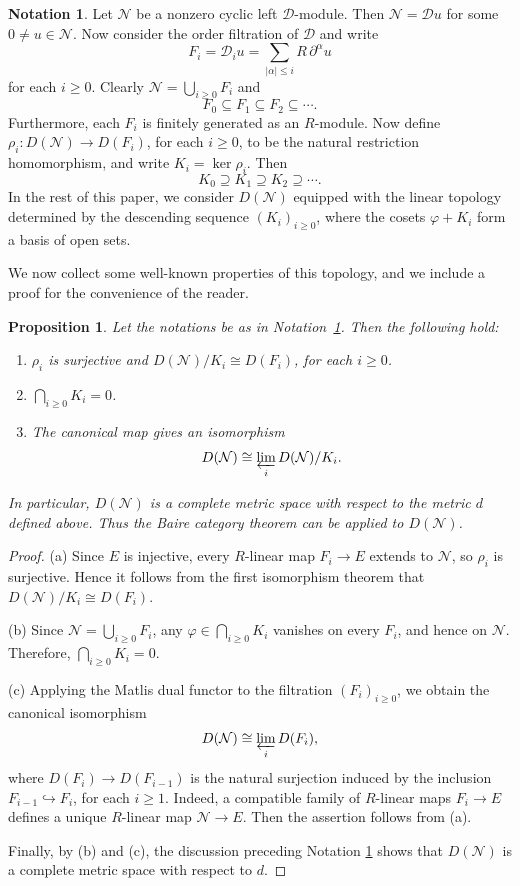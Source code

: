 \documentclass[11pt]{amsart}
\newtheorem{proposition}[theorem]{Proposition}
\theoremstyle{definition}
\newtheorem{notation}[theorem]{Notation}
\newcommand{\D}{\mathcal D}
\newcommand{\N}{\mathcal N}
\begin{document}
\begin{notation}\label{n}
Let $\N$ be a nonzero cyclic left $\D$-module. Then $\N=\D u$ for some $0\neq u\in\N$. Now consider the order filtration of $\D$ and write
\[
  F_i=\D_iu=\sum_{|\alpha|\le i}R\,\partial^{\alpha}u
\]
for each $i\ge 0$. Clearly $\N=\bigcup_{i\ge 0}F_i$ and
\[
  F_0\subseteq F_1\subseteq F_2\subseteq\cdots.
\]
Furthermore, each $F_i$ is finitely generated as an $R$-module. Now define
$\rho_i\colon D(\N)\longrightarrow D(F_i)$, for each $i\ge 0$, to be
the natural restriction homomorphism, and write $K_i=\ker\rho_i$. Then
\[
  K_0\supseteq K_1\supseteq K_2\supseteq\cdots.
\]
In the rest of this paper, we consider $D(\N)$ equipped with the linear topology determined by the descending sequence $(K_i)_{i\ge 0}$, where the cosets $\varphi+K_i$ form a basis of open sets.
\end{notation}
We now collect some well-known properties of this topology, and we include a proof for the convenience of the reader.
\begin{proposition}\label{p}
Let the notations be as in Notation~\ref{n}. Then the following hold:
\begin{enumerate}
\item[(a)] $\rho_i$ is surjective and $D(\N)/K_i\cong D(F_i)$, for
           each $i\ge 0$.
\item[(b)] $\bigcap_{i\ge 0}K_i=0$.
\item[(c)] The canonical map gives an isomorphism
           \[
             D(\N)\cong\varprojlim_{i}D(\N)/K_i.
           \]
\end{enumerate}
In particular, $D(\N)$ is a complete metric space with respect to the metric $d$ defined above. Thus the Baire category theorem can be applied to $D(\N)$.
\end{proposition}
\begin{proof}
(a) Since $E$ is injective, every $R$-linear map $F_i\to E$ extends to $\N$, so $\rho_i$ is surjective. Hence it follows from the first isomorphism theorem that $D(\N)/K_i\cong D(F_i)$.

(b) Since $\N=\bigcup_{i\ge 0}F_i$, any
$\varphi\in\bigcap_{i\ge 0}K_i$ vanishes on every $F_i$, and hence on
$\N$. Therefore, $\bigcap_{i\ge 0}K_i=0$.

(c) Applying the Matlis dual functor to the filtration $(F_i)_{i\ge 0}$, we
obtain the canonical isomorphism
\[
  D(\N)\cong\varprojlim_{i}D(F_i),
\]
where $D(F_i)\longrightarrow D(F_{i-1})$ is the natural surjection induced by
the inclusion $F_{i-1}\hookrightarrow F_i$, for each $i\ge 1$. Indeed, a compatible family of $R$-linear maps $F_i\to E$ defines a unique $R$-linear map $\N\to E$. Then the assertion follows from (a).

Finally, by (b) and (c), the discussion preceding Notation \ref{n} shows that $D(\N)$ is a complete metric space with respect to $d$.
\end{proof}
\end{document}
